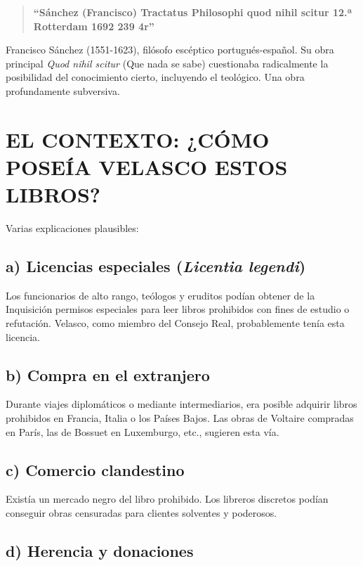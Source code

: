 \documentclass[12pt,a4paper]{article}
\begin{document}
\begin{quote}
\textbf{``Sánchez (Francisco) Tractatus Philosophi quod nihil scitur 12.ª Rotterdam 1692 239 4r''}
\end{quote}

Francisco Sánchez (1551-1623), filósofo escéptico portugués-español. Su obra principal \textit{Quod nihil scitur} (Que nada se sabe) cuestionaba radicalmente la posibilidad del conocimiento cierto, incluyendo el teológico. Una obra profundamente subversiva.

\section{EL CONTEXTO: ¿CÓMO POSEÍA VELASCO ESTOS LIBROS?}

Varias explicaciones plausibles:

\subsection*{a) Licencias especiales (\textit{Licentia legendi})}

Los funcionarios de alto rango, teólogos y eruditos podían obtener de la Inquisición permisos especiales para leer libros prohibidos con fines de estudio o refutación. Velasco, como miembro del Consejo Real, probablemente tenía esta licencia.

\subsection*{b) Compra en el extranjero}

Durante viajes diplomáticos o mediante intermediarios, era posible adquirir libros prohibidos en Francia, Italia o los Países Bajos. Las obras de Voltaire compradas en París, las de Bossuet en Luxemburgo, etc., sugieren esta vía.

\subsection*{c) Comercio clandestino}

Existía un mercado negro del libro prohibido. Los libreros discretos podían conseguir obras censuradas para clientes solventes y poderosos.

\subsection*{d) Herencia y donaciones}
\end{document}
